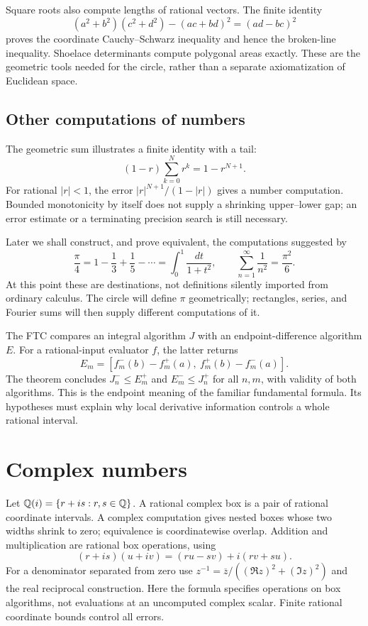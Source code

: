 Square roots also compute lengths of rational vectors.  The finite identity
\[
 (a^2+b^2)(c^2+d^2)-(ac+bd)^2=(ad-bc)^2
\]
proves the coordinate Cauchy--Schwarz inequality and hence the broken-line
inequality.  Shoelace determinants compute polygonal areas exactly.  These
are the geometric tools needed for the circle, rather than a separate
axiomatization of Euclidean space.

\subsection{Other computations of numbers}
\label{rem:sources-of-raw-reals}
The geometric sum illustrates a finite identity with a tail:
\[
 (1-r)\sum_{k=0}^{N}r^k=1-r^{N+1}.
\]
For rational $|r|<1$, the error $|r|^{N+1}/(1-|r|)$ gives a number
computation.  Bounded monotonicity by itself does not supply a shrinking
upper--lower gap; an error estimate or a terminating precision search is
still necessary.

Later we shall construct, and prove equivalent, the computations suggested
by
\[
 \frac\pi4=1-\frac13+\frac15-\cdots
   =\int_0^1\frac{dt}{1+t^2},\qquad
 \sum_{n=1}^{\infty}\frac1{n^2}=\frac{\pi^2}{6}.
\]
At this point these are destinations, not definitions silently imported from
ordinary calculus.  The circle will define $\pi$ geometrically; rectangles,
series, and Fourier sums will then supply different computations of it.

\begin{remark}\label{rem:calculus-as-equivalence}
The FTC compares an integral algorithm $J$ with an endpoint-difference
algorithm $E$.  For a rational-input evaluator $f$, the latter returns
\[
 E_m=[f_m^-(b)-f_m^+(a),\ f_m^+(b)-f_m^-(a)].
\]
The theorem concludes $J_n^-\le E_m^+$ and $E_m^-\le J_n^+$ for all
$n,m$, with validity of both algorithms.  This is the endpoint meaning
of the familiar fundamental formula.  Its hypotheses must explain why
local derivative information controls a whole rational interval.
\end{remark}

\section{Complex numbers}

Let $\mathbb{Q}(i)=\{r+is:r,s\in\mathbb{Q}\}$.  A rational complex box is a pair of
rational coordinate intervals.  A complex computation gives nested boxes
whose two widths shrink to zero; equivalence is coordinatewise overlap.
Addition and multiplication are rational box operations, using
\[
 (r+is)(u+iv)=(ru-sv)+i(rv+su).
\]
For a denominator separated from zero use
$z^{-1}=\overline z/( (\Re z)^2+(\Im z)^2)$ and the real reciprocal
construction.  Here the formula specifies operations on box algorithms,
not evaluations at an uncomputed complex scalar.  Finite rational
coordinate bounds control all errors.

